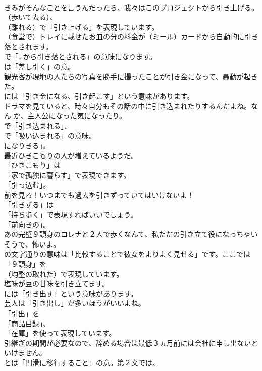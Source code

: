\documentclass[8pt]{extreport}
\begin{document}
\begin{CJK}{UTF8}{min}
\\	きみがそんなことを言うんだったら、我々はこのプロジェクトから引き上げる。 
\\	（歩いて去る）、
\\	（離れる）で「引き上げる」を表現しています。	
\\	（食堂で）トレイに載せたお皿の分の料金が（ミール）カードから自動的に引き落とされます。 
\\	で「…から引き落とされる」の意味になります。
\\	は「差し引く」の意。	
\\	観光客が現地の人たちの写真を勝手に撮ったことが引き金になって、暴動が起きた。 
\\	には「引き金になる、引き起こす」という意味があります。	
\\	ドラマを見ていると、時々自分もその話の中に引き込まれたりするんだよね。なん か、主人公になった気になったり。 
\\	で「引き込まれる」、
\\	で「吸い込まれる」の意味。
\\	になりきる」。	
\\	最近ひきこもりの人が増えているようだ。 
\\	「ひきこもり」は
\\	「家で孤独に暮らす」で表現できます。
\\	「引っ込む」。	
\\	前を見ろ！いつまでも過去を引きずっていてはいけないよ！ 
\\	「引きずる」は
\\	「持ち歩く」で表現すればいいでしょう。
\\	「前向きの」。	
\\	あの完璧９頭身のロレナと２人で歩くなんて、私ただの引き立て役になっちゃいそうで、怖いよ。 
\\	の文字通りの意味は「比較することで彼女をよりよく見せる」です。ここでは「９頭身」を
\\	（均整の取れた）で表現しています。	
\\	塩味が豆の甘味を引き立てます。 
\\	には「引き出す」という意味があります。	
\\	芸人は「引き出し」が多いほうがいいよね。 
\\	「引出」を
\\	「商品目録」、
\\	「在庫」を使って表現しています。	
\\	引継ぎの期間が必要なので、辞める場合は最低３ヵ月前には会社に申し出ないといけません。 
\\	とは「円滑に移行すること」の意。第２文では、

\end{CJK}
\end{document}

